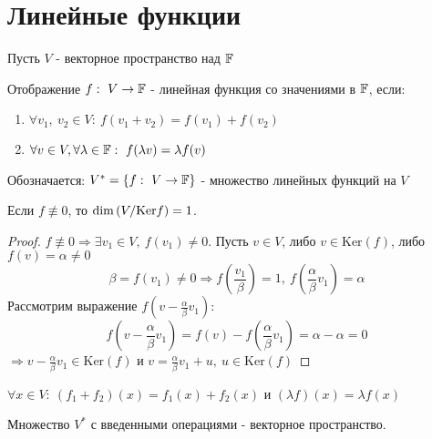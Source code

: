 \section{Линейные функции}
    Пусть $V$ - векторное пространство над $\mathbb{F}$
    \begin{definition}
        Отображение $f: \ V \to \mathbb{F}$ - линейная функция со значениями в $\mathbb{F}$, если:
        \begin{enumerate}
            \item $\forall v_1, \ v_2 \in V: \ f(v_1 + v_2) = f(v_1) + f(v_2)$
            \item $\forall v \in V, \forall \lambda \in \mathbb{F}: \ f(\lambda v) = \lambda f(v)$  
        \end{enumerate}
        Обозначается: $V^{*} = \{f : \ V \to \mathbb{F}\}$ - множество линейных функций на $V$  
    \end{definition}
    \begin{lemma}
        Если $f \not \equiv 0$, то $\dim{(V/\textup{Ker}f)}=1$. 
    \end{lemma} 
    \begin{proof}
        $f \not \equiv 0 \Rightarrow \exists v_1 \in V, \ f(v_1) \neq 0$. Пусть $v \in V$, либо $v \in \text{Ker}(f)$, либо $f(v) = \alpha \neq 0$ 
        $$\beta = f(v_1) \neq 0 \Longrightarrow f(\frac{v_1}{\beta}) = 1, \ f(\frac{\alpha}{\beta}v_1) = \alpha$$
        Рассмотрим выражение $f(v - \frac{\alpha}{\beta}v_1)$:
        $$f(v - \frac{\alpha}{\beta}v_1) = f(v) - f(\frac{\alpha}{\beta}v_1) = \alpha - \alpha = 0$$
        $\Longrightarrow v - \frac{\alpha}{\beta}v_1 \in \text{Ker}(f)$ и $v = \frac{\alpha}{\beta}v_1 + u, \ u \in \text{Ker}(f)$  
    \end{proof}
    \begin{remark}
        $\forall x \in V: \ (f_1 + f_2)(x) = f_1(x) + f_2(x)$  и $(\lambda f)(x) = \lambda f (x)$ 
    \end{remark}
    \begin{lemma}
        Множество $V^{*}$ с введенными операциями - векторное пространство. 
    \end{lemma}

